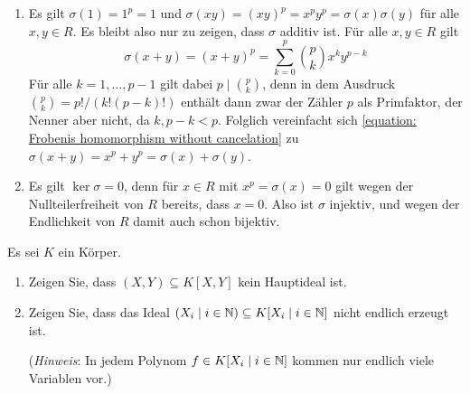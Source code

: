 \begin{solution}
  \begin{enumerate}
    \item
      Es gilt $\sigma(1) = 1^p = 1$ und $\sigma(xy) = (xy)^p = x^p y^p = \sigma(x) \sigma(y)$ für alle $x, y \in R$.
      Es bleibt also nur zu zeigen, dass $\sigma$ additiv ist.
      Für alle $x, y \in R$ gilt
      \begin{equation}
        \label{equation: Frobenis homomorphism without cancelation}
        \sigma(x+y) = (x+y)^p = \sum_{k=0}^p \binom{p}{k} x^k y^{p-k}
      \end{equation}
      Für alle $k = 1, \dotsc, p-1$ gilt dabei $p \mid \binom{p}{k}$, denn in dem Ausdruck $\binom{p}{k} = p!/(k!(p-k)!)$ enthält dann zwar der Zähler $p$ als Primfaktor, der Nenner aber nicht, da $k, p-k < p$.
      Folglich vereinfacht sich \eqref{equation: Frobenis homomorphism without cancelation} zu $\sigma(x+y) = x^p + y^p = \sigma(x) + \sigma(y)$.
    \item
      Es gilt $\ker \sigma = 0$, denn für $x \in R$ mit $x^p = \sigma(x) = 0$ gilt wegen der Nullteilerfreiheit von $R$ bereits, dass $x = 0$.
      Also ist $\sigma$ injektiv, und wegen der Endlichkeit von $R$ damit auch schon bijektiv.
  \end{enumerate}
\end{solution}


\begin{question}
  \label{question: examples for non principal and not finitely generated modules}
  Es sei $K$ ein Körper.
  \begin{enumerate}
    \item
      Zeigen Sie, dass $(X,Y) \subseteq K[X,Y]$ kein Hauptideal ist.
    \item
      Zeigen Sie, dass das Ideal $(X_i \mid i \in \mathbb{N}) \subseteq K[X_i \mid i \in \mathbb{N}]$ nicht endlich erzeugt ist.
      
      (\emph{Hinweis}:
       In jedem Polynom $f \in K[X_i \mid i \in \mathbb{N}]$ kommen nur endlich viele Variablen vor.)
  \end{enumerate}
\end{question}




